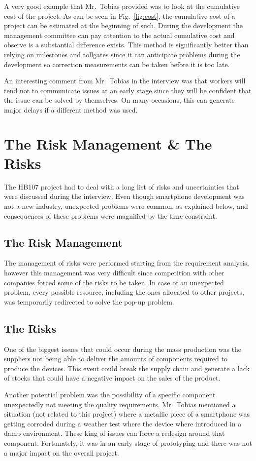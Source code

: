 \documentclass[journal]{IEEEtran}
\begin{document}
A very good example that Mr.~Tobias provided was to look at the cumulative cost of the project. As can be seen in Fig.~\ref{fig:cost}, the cumulative cost of a project can be estimated at the beginning of such. During the development the management committee can pay attention to the actual cumulative cost and observe is a substantial difference exists. This method is significantly better than relying on milestones and tollgates since it can anticipate problems during the development so correction measurements can be taken before it is too late.

An interesting comment from Mr.~Tobias in the interview was that workers will tend not to communicate issues at an early stage since they will be confident that the issue can be solved by themselves. On many occasions, this can generate major delays if a different method was used.

\section{The Risk Management \& The Risks}
The HB107 project had to deal with a long list of risks and uncertainties that were discussed during the interview. Even though smartphone development was not a new industry, unexpected problems were common, as explained below, and consequences of these problems were magnified by the time constraint. 

\subsection{The Risk Management}
The management of risks were performed starting from the requirement analysis, however this management was very difficult since competition with other companies forced some of the risks to be taken. In case of an unexpected problem, every possible resource, including the ones allocated to other projects, was temporarily redirected to solve the pop-up problem.

\subsection{The Risks}
One of the biggest issues that could occur during the mass production was the suppliers not being able to deliver the amounts of components required to produce the devices. This event could break the supply chain and generate a lack of stocks that could have a negative impact on the sales of the product.

Another potential problem was the possibility of a specific component unexpectedly not meeting the quality requirements. Mr.~Tobias mentioned a situation (not related to this project) where a metallic piece of a smartphone was getting corroded during a weather test where the device where introduced in a damp environment. These king of issues can force a redesign around that component. Fortunately, it was in an early stage of prototyping and there was not a major impact on the overall project.
\end{document}
